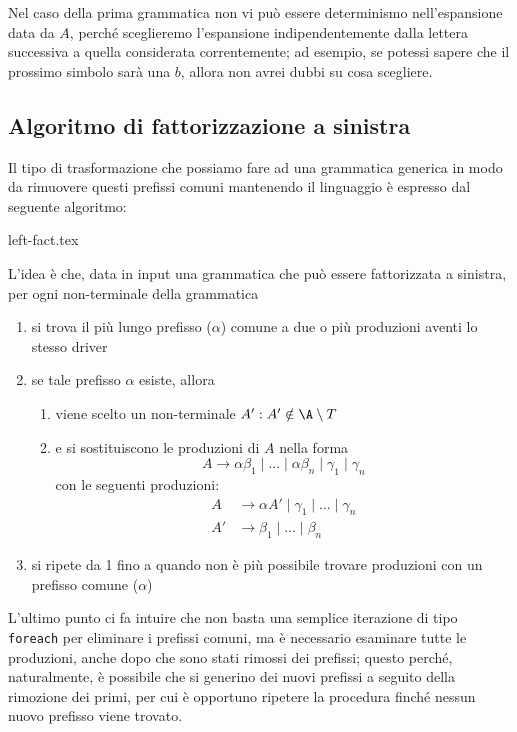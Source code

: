 \documentclass[class=book, crop=false, oneside, 12pt]{standalone}
\begin{document}
Nel caso della prima grammatica non vi può essere determinismo nell'espansione data da \(A\), perché sceglieremo l'espansione indipendentemente dalla lettera successiva a quella considerata correntemente; ad esempio, se potessi sapere che il prossimo simbolo sarà una \(b\), allora non avrei dubbi su cosa scegliere.

\subsection{Algoritmo di fattorizzazione a sinistra}
Il tipo di trasformazione che possiamo fare ad una grammatica generica in modo da rimuovere questi prefissi comuni mantenendo il linguaggio è espresso dal seguente algoritmo: 

{left-fact.tex}

L'idea è che, data in input una grammatica che può essere fattorizzata a sinistra, per ogni non-terminale della grammatica
\begin{enumerate}
	\item si trova il più lungo prefisso (\(\alpha\)) comune a due o più produzioni aventi lo stesso driver
	\item se tale prefisso \(\alpha\) esiste, allora
	\begin{enumerate}
		\item viene scelto un non-terminale \(A' : A' \notin \A \setminus T\)
		\item e si sostituiscono le produzioni di \(A\) nella forma
		\begin{equation*}
    			A \rightarrow \alpha \beta_1 \mid ... \mid \alpha \beta_n \mid \gamma_1 \mid \gamma_n
		\end{equation*}
		con le seguenti produzioni: 
		\begin{align*}
    			A &\rightarrow \alpha A' \mid \gamma_1 \mid \ldots \mid \gamma_n \\
    			A' &\rightarrow \beta_1 \mid \ldots \mid \beta_n
		\end{align*}
	\end{enumerate} 
	\item si ripete da 1 fino a quando non è più possibile trovare produzioni con un prefisso comune (\(\alpha\))
\end{enumerate}

L'ultimo punto ci fa intuire che non basta una semplice iterazione di tipo \texttt{foreach} per eliminare i prefissi comuni, ma è necessario esaminare tutte le produzioni, anche dopo che sono stati rimossi dei prefissi; questo perché, naturalmente, è possibile che si generino dei nuovi prefissi a seguito della rimozione dei primi, per cui è opportuno ripetere la procedura finché nessun nuovo prefisso viene trovato.
\end{document}

